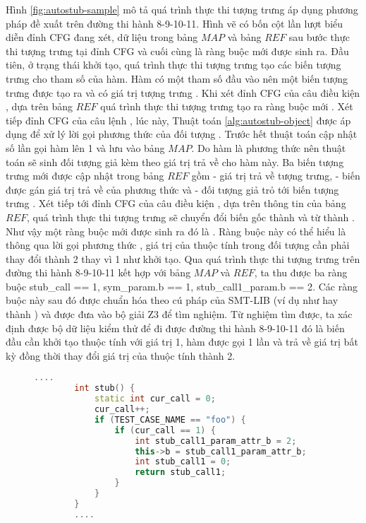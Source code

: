 Hình \autoref{fig:autostub-sample} mô tả quá trình thực thi tượng trưng áp dụng phương pháp đề xuất trên đường thi hành 8-9-10-11. Hình vẽ có bốn cột lần lượt biểu diễn đỉnh CFG đang xét, dữ liệu trong bảng $MAP$ và bảng $REF$ sau bước thực thi tượng trưng tại đỉnh CFG và cuối cùng là ràng buộc mới được sinh ra. Đầu tiên, ở trạng thái khởi tạo, quá trình thực thi tượng trưng tạo các biến tượng trưng cho tham số của hàm. Hàm  có một tham số đầu vào nên một biến tượng trưng  được tạo ra và có giá trị tượng trưng . Khi xét đỉnh CFG của câu điều kiện , dựa trên bảng $REF$ quá trình thực thi tượng trưng tạo ra ràng buộc mới . Xét tiếp đỉnh CFG của câu lệnh , lúc này, Thuật toán \autoref{alg:autostub-object} được áp dụng để xử lý lời gọi phương thức của đối tượng . Trước hết thuật toán cập nhật số lần gọi hàm  lên 1 và lưu vào bảng $MAP$. Do hàm  là phương thức nên thuật toán sẽ sinh đối tượng giả kèm theo giá trị trả về cho hàm này. Ba biến tượng trưng mới được cập nhật trong bảng $REF$ gồm  - giá trị trả về tượng trưng,  - biến được gán giá trị trả về của phương thức và  - đối tượng giả trỏ tới biến tượng trưng . Xét tiếp tới đỉnh CFG của câu điều kiện , dựa trên thông tin của bảng $REF$, quá trình thực thi tượng trưng sẽ chuyển đổi biến  gốc thành  và từ  thành . Như vậy một ràng buộc mới được sinh ra đó là . Ràng buộc này có thể hiểu là thông qua lời gọi phương thức , giá trị của thuộc tính  trong đối tượng  cần phải thay đổi thành 2 thay vì 1 như khởi tạo. Qua quá trình thực thi tượng trưng trên đường thi hành 8-9-10-11 kết hợp với bảng $MAP$ và $REF$, ta thu được ba ràng buộc {stub\_call == 1, sym\_param.b == 1, stub\_call1\_param.b == 2}. Các ràng buộc này sau đó được chuẩn hóa theo cú pháp của SMT-LIB (ví dụ như hay  thành ) và được đưa vào bộ giải Z3 để tìm nghiệm. Từ nghiệm tìm được, ta xác định được bộ dữ liệu kiểm thử để đi được đường thi hành 8-9-10-11 đó là biến  đầu cần khởi tạo thuộc tính  với giá trị 1, hàm  được gọi 1 lần và trả về giá trị bất kỳ đồng thời thay đổi giá trị của thuộc tính  thành 2. 
\vspace{5mm}
\begin{figure}[h]
	\begin{lstlisting}[language=C++, caption={Sự thay đổi của hàm \tcode{stub} với bộ dữ liệu kiểm thử mới.}, label={cod:stub-final}, captionpos=b]
		....
		int stub() {
			static int cur_call = 0;
			cur_call++;
			if (TEST_CASE_NAME == "foo") {
				if (cur_call == 1) {
					int stub_call1_param_attr_b = 2;
					this->b = stub_call1_param_attr_b;
					int stub_call1 = 0;
					return stub_call1;
				}
			}
		}
		....
	\end{lstlisting}
\end{figure}

